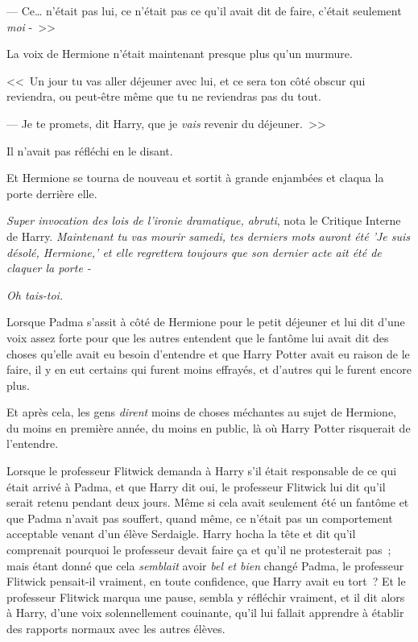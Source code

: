 --- Ce… n'était pas lui, ce n'était pas ce qu'il avait dit de faire, c'était seulement \emph{moi} -~>>

La voix de Hermione n'était maintenant presque plus qu'un murmure.

<<~Un jour tu vas aller déjeuner avec lui, et ce sera ton côté obscur qui reviendra, ou peut-être même que tu ne reviendras pas du tout.

--- Je te promets, dit Harry, que je \emph{vais} revenir du déjeuner.~>>

Il n'avait pas réfléchi en le disant.

Et Hermione se tourna de nouveau et sortit à grande enjambées et claqua la porte derrière elle.

\emph{Super invocation des lois de l'ironie dramatique, abruti}, nota le Critique Interne de Harry. \emph{Maintenant tu vas mourir samedi, tes derniers mots auront été 'Je suis désolé, Hermione,' et elle regrettera toujours que son dernier acte ait été de claquer la porte -}

\emph{Oh tais-toi.}

\later

Lorsque Padma s'assit à côté de Hermione pour le petit déjeuner et lui dit d'une voix assez forte pour que les autres entendent que le fantôme lui avait dit des choses qu'elle avait eu besoin d'entendre et que Harry Potter avait eu raison de le faire, il y en eut certains qui furent moins effrayés, et d'autres qui le furent encore plus.

Et après cela, les gens \emph{dirent} moins de choses méchantes au sujet de Hermione, du moins en première année, du moins en public, là où Harry Potter risquerait de l'entendre.

Lorsque le professeur Flitwick demanda à Harry s'il était responsable de ce qui était arrivé à Padma, et que Harry dit oui, le professeur Flitwick lui dit qu'il serait retenu pendant deux jours. Même si cela avait seulement été un fantôme et que Padma n'avait pas souffert, quand même, ce n'était pas un comportement acceptable venant d'un élève Serdaigle. Harry hocha la tête et dit qu'il comprenait pourquoi le professeur devait faire ça et qu'il ne protesterait pas~; mais étant donné que cela \emph{semblait} avoir \emph{bel et bien} changé Padma, le professeur Flitwick pensait-il vraiment, en toute confidence, que Harry avait eu tort~? Et le professeur Flitwick marqua une pause, sembla y réfléchir vraiment, et il dit alors à Harry, d'une voix solennellement couinante, qu'il lui fallait apprendre à établir des rapports normaux avec les autres élèves.

